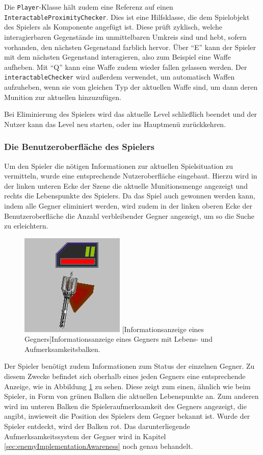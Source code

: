 Die \texttt{Player}-Klasse hält zudem eine Referenz auf einen \texttt{InteractableProximityChecker}. Dies ist eine Hilfsklasse, die dem Spielobjekt des Spielers als Komponente angefügt ist. Diese prüft zyklisch, welche interagierbaren Gegenstände im unmittelbaren Umkreis sind und hebt, sofern vorhanden, den nächsten Gegenstand farblich hervor. Über "`E"' kann der Spieler mit dem nächsten Gegenstand interagieren, also zum Beispiel eine Waffe aufheben. Mit "`Q"' kann eine Waffe zudem wieder fallen gelassen werden. Der \texttt{interactableChecker} wird außerdem verwendet, um automatisch Waffen aufzuheben, wenn sie vom gleichen Typ der aktuellen Waffe sind, um dann deren Munition zur aktuellen hinzuzufügen.

Bei Eliminierung des Spielers wird das aktuelle Level schließlich beendet und der Nutzer kann das Level neu starten, oder ins Hauptmenü zurückkehren.

\subsubsection{Die Benutzeroberfläche des Spielers}\label{sec:uiPlayer}
Um den Spieler die nötigen Informationen zur aktuellen Spielsituation zu vermitteln, wurde eine entsprechende Nutzeroberfläche eingebaut. Hierzu wird in der linken unteren Ecke der Szene die aktuelle Munitionsmenge angezeigt und rechts die Lebenspunkte des Spielers. Da das Spiel auch gewonnen werden kann, indem alle Gegner eliminiert werden, wird zudem in der linken oberen Ecke der Benutzeroberfläche die Anzahl verbleibender Gegner angezeigt, um so die Suche zu erleichtern.

\begin{figure}[h]
 \centering
 \includegraphics[width=0.2\linewidth]{pics/enemy_hud.PNG}
 [Informationsanzeige eines Gegners]{Informationsanzeige eines Gegners mit Lebens- und Aufmerksamkeitsbalken.}
	\label{fig:enemy_hud}
\end{figure}

Der Spieler benötigt zudem Informationen zum Status der einzelnen Gegner. Zu diesem Zwecke befindet sich oberhalb eines jeden Gegners eine entsprechende Anzeige, wie in Abbildung \ref{fig:enemy_hud} zu sehen. Diese zeigt zum einen, ähnlich wie beim Spieler, in Form von grünen Balken die aktuellen Lebenspunkte an. Zum anderen wird im unteren Balken die Spieleraufmerksamkeit des Gegners angezeigt, die angibt, inwieweit die Position des Spielers dem Gegner bekannt ist. Wurde der Spieler entdeckt, wird der Balken rot. Das darunterliegende Aufmerksamkeitssystem der Gegner wird in Kapitel \ref{sec:enemyImplementationAwareness} noch genau behandelt.

